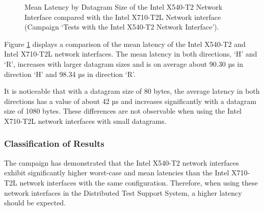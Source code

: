 \begin{figure}[h!]
  \centering
  \caption{Mean Latency by Datagram Size of the Intel X540-T2 Network Interface compared with the Intel X710-T2L Network interface (Campaign `Tests with the Intel X540-T2 Network Interface').}
  \label{fig:540Mean}
\end{figure}


Figure \ref{fig:540Mean} displays a comparison of the mean latency of the Intel X540-T2 and Intel X710-T2L network interfaces. The mean latency in both directions, `H' and `R', increases with larger datagram sizes and is on average about 90.30 µs in direction `H' and 98.34 µs in direction `R'.

It is noticeable that with a datagram size of 80 bytes, the average latency in both directions has a value of about 42 µs and increases significantly with a datagram size of 1080 bytes. These differences are not observable when using the Intel X710-T2L network interfaces with small datagrams.

\subsubsection{Classification of Results}
The campaign has demonstrated that the Intel X540-T2 network interfaces exhibit significantly higher worst-case and mean latencies than the Intel X710-T2L network interfaces with the same configuration. Therefore, when using these network interfaces in the Distributed Test Support System, a higher latency should be expected. \\

